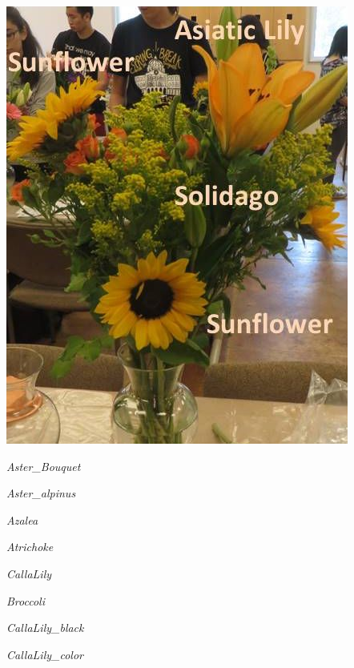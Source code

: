 \documentclass{article}
\begin{document}
\begin{center}
\includegraphics[width=0.9\textheight, angle=90]{../Arrangement4.jpg}
\end{center}
\newpage

\noindent   
\vfill
\centerline{{\Large\emph{Aster_Bouquet}}}
\vfill
\newpage

\noindent   
\vfill
\centerline{{\Large\emph{Aster_alpinus}}}
\vfill
\newpage

\noindent   
\vfill
\centerline{{\Large\emph{Azalea}}}
\vfill
\newpage

\noindent   
\vfill
\centerline{{\Large\emph{Atrichoke}}}
\vfill
\newpage

\noindent   
\vfill
\centerline{{\Large\emph{CallaLily}}}
\vfill
\newpage

\noindent   
\vfill
\centerline{{\Large\emph{Broccoli}}}
\vfill
\newpage

\noindent   
\vfill
\centerline{{\Large\emph{CallaLily_black}}}
\vfill
\newpage

\noindent   
\vfill
\centerline{{\Large\emph{CallaLily_color}}}
\vfill
\newpage
\end{document}
